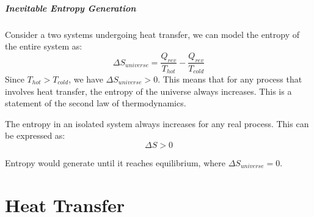 \documentclass[11pt]{report}
\begin{document}
\paragraph{Inevitable Entropy Generation} Consider a two systems undergoing heat transfer, we can model the entropy of the entire system as:
$$
    \Delta S_{universe} = \frac{Q_{rev}}{T_{hot}} - \frac{Q_{rev}}{T_{cold}}
$$
Since $T_{hot} > T_{cold}$, we have $\Delta S_{universe} > 0$. This means that for any process that involves heat transfer, the entropy of the universe always increases. This is a statement of the second law of thermodynamics.

\begin{theorem}
    The entropy in an isolated system always increases for any real process. This can be expressed as:
    \begin{equation}
        \Delta S > 0
    \end{equation}
   
    Entropy would generate until it reaches equilibrium, where $\Delta S_{universe} = 0$.
\end{theorem}
\chapter{Heat Transfer}
\end{document}
